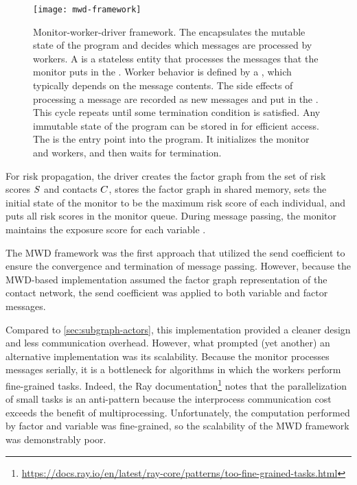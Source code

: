 \begin{figure}[htbp]
\centering
\texttt{[image: mwd-framework]}
\caption[Monitor-worker-driver framework]{Monitor-worker-driver framework. The  encapsulates the mutable state of the program and decides which messages are processed by workers. A  is a stateless entity that processes the messages that the monitor puts in the . Worker behavior is defined by a , which typically depends on the message contents. The side effects of processing a message are recorded as new messages and put in the . This cycle repeats until some termination condition is satisfied. Any immutable state of the program can be stored in  for efficient access. The  is the entry point into the program. It initializes the monitor and workers, and then waits for termination.}
\label{fig:mwd-framework}
\end{figure}

For risk propagation, the driver creates the factor graph from the set of risk scores $S$ and contacts $C$, stores the factor graph in shared memory, sets the initial state of the monitor to be the maximum risk score of each individual, and puts all risk scores in the monitor queue. During message passing, the monitor maintains the exposure score for each variable \vertexName.

The MWD framework was the first approach that utilized the send coefficient to ensure the convergence and termination of message passing. However, because the MWD-based implementation assumed the factor graph representation of the contact network, the send coefficient was applied to both variable and factor messages.

Compared to \cref{sec:subgraph-actors}, this implementation provided a cleaner design and less communication overhead. However, what prompted (yet another) an alternative implementation was its scalability. Because the monitor processes messages serially, it is a bottleneck for algorithms in which the workers perform fine-grained tasks. Indeed, the Ray documentation\footnote{\url{https://docs.ray.io/en/latest/ray-core/patterns/too-fine-grained-tasks.html}} notes that the parallelization of small tasks is an anti-pattern because the interprocess communication cost exceeds the benefit of multiprocessing. Unfortunately, the computation performed by factor \verticesName and variable \verticesName was fine-grained, so the scalability of the MWD framework was demonstrably poor.

